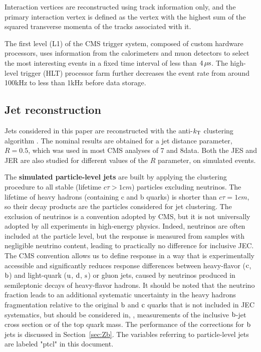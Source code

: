 \documentclass[11pt,twoside,a4paper,cmspaper,final,collab]{cms-tdr}
\begin{document}
Interaction vertices are reconstructed using track information only, and the primary interaction vertex
is defined as the vertex with the highest sum of the squared transverse momenta of the tracks associated with it.

The first level (L1) of the CMS trigger system, composed of custom hardware processors, uses information
from the calorimeters and muon detectors to select the most interesting events in a fixed time interval
of less than $4\,\mu\text{s}$. The high-level trigger (HLT) processor farm further decreases the event rate from
around 100\unit{kHz} to less than 1\unit{kHz} before data storage.

\subsection{Jet reconstruction}

Jets considered in this paper are reconstructed with the anti-$k_{\mathrm{T}}$ clustering algorithm \cite{Cacciari:2008gp}. The nominal results
are obtained for a jet distance parameter, $R=0.5$, which was used in most CMS analyses of 7 and 8\TeV data. Both the JES and JER are also studied for
different values of the $R$ parameter, on simulated events.

The \textbf{simulated particle-level jets} are built by applying the clustering procedure to all stable (lifetime $c\tau>1\unit{cm}$) particles  excluding neutrinos. The lifetime of heavy hadrons (containing c and b quarks) is shorter than $c\tau=1\unit{cm}$, so their decay products are the particles considered for jet clustering.
The exclusion of neutrinos is a convention adopted by CMS, but it is not universally adopted by all experiments in high-energy physics. Indeed, neutrinos are often included at the particle level, but the response is measured from samples
with negligible neutrino content, leading to practically no difference for inclusive JEC.
The CMS convention allows us to define response in a way that is experimentally accessible and significantly reduces response differences
between heavy-flavor ($\mathrm{c}$, $\mathrm{b}$) and light-quark ($\mathrm{u}$, $\mathrm{d}$, $\mathrm{s}$) or gluon jets, caused by neutrinos produced in semileptonic decays of heavy-flavor hadrons.
It should be noted that the neutrino fraction leads to an additional systematic uncertainty in the heavy hadrons fragmentation relative to the original $\mathrm{b}$ and $\mathrm{c}$ quarks that is not included in
JEC systematics, but should be considered in, \eg, measurements of the inclusive $\mathrm{b}$-jet cross section or of the top quark mass.
The performance of the corrections for $\mathrm{b}$ jets is discussed in Section~\ref{sec:Zb}. The variables referring to
particle-level jets are labeled "ptcl" in this document.
\end{document}
